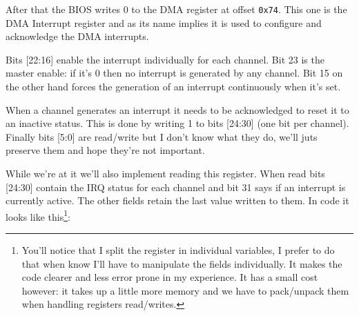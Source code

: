 \documentclass[a4paper]{article}
\newcommand{\code}[1] {\texttt{#1}}
\begin{document}
After that the BIOS writes 0 to the DMA register at offset
\code{0x74}. This one is the DMA Interrupt register and as its name
implies it is used to configure and acknowledge the DMA
interrupts.

Bits [22:16] enable the interrupt individually for each channel. Bit
23 is the master enable: if it's 0 then no interrupt is generated by
any channel. Bit 15 on the other hand forces the generation of an
interrupt continuously when it's set.

When a channel generates an interrupt it needs to be acknowledged to
reset it to an inactive status. This is done by writing 1 to bits
[24:30] (one bit per channel). Finally bits [5:0] are read/write but I
don't know what they do, we'll juts preserve them and hope they're not
important.

While we're at it we'll also implement reading this register. When
read bits [24:30] contain the IRQ status for each channel and bit 31
says if an interrupt is currently active. The other fields retain the
last value written to them. In code it looks like this\footnote{You'll
  notice that I split the register in individual variables, I prefer
  to do that when know I'll have to manipulate the fields
  individually. It makes the code clearer and less error prone in my
  experience. It has a small cost however: it takes up a little more
  memory and we have to pack/unpack them when handling registers
  read/writes.}:
\end{document}
